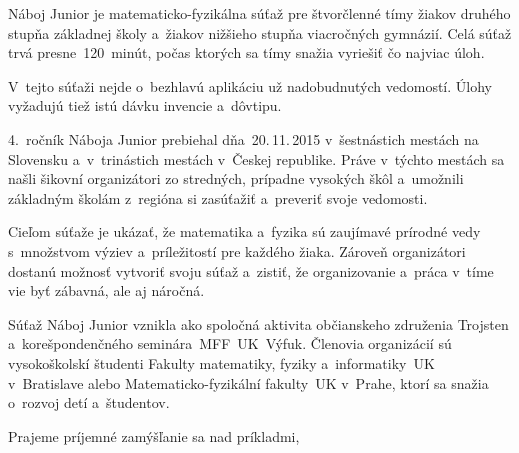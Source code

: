 {{Náboj Junior je matematicko-fyzikálna súťaž pre štvorčlenné tímy žiakov druhého stupňa základnej
školy a~žiakov nižšieho stupňa viacročných gymnázií. Celá súťaž trvá presne~120~minút,
počas ktorých sa tímy snažia vyriešiť čo najviac úloh.

V~tejto súťaži nejde o~bezhlavú aplikáciu už nadobudnutých vedomostí. Úlohy
vyžadujú tiež istú dávku invencie a~dôvtipu.

4.~ročník Náboja Junior prebiehal dňa~20.\,11.\,2015 v~šestnástich mestách
na Slovensku a~v~trinástich mestách v~Českej republike.
Práve v~týchto mestách sa našli šikovní organizátori zo stredných, prípadne
vysokých škôl a~umožnili základným školám z~regióna si zasúťažiť
a~preveriť svoje vedomosti.

Cieľom súťaže je ukázať, že matematika a~fyzika sú zaujímavé prírodné vedy
s~množstvom výziev a~príležitostí pre každého žiaka. Zároveň organizátori
dostanú možnosť vytvoriť svoju súťaž a~zistiť, že organizovanie a~práca
v~tíme vie byť zábavná, ale aj náročná.

Súťaž Náboj Junior vznikla ako spoločná aktivita občianskeho združenia Trojsten
a~korešpondenčného seminára~MFF~UK~Výfuk. Členovia organizácií sú
vysokoškolskí študenti Fakulty matematiky, fyziky a~informatiky~UK
v~Bratislave alebo Ma\-te\-ma\-ticko-fyzikální fakulty~UK v~Prahe,
ktorí sa snažia o~rozvoj detí a~študentov. 
\par\noindent
Prajeme príjemné zamýšľanie sa nad príkladmi,

\hfill{}
}%
}%
